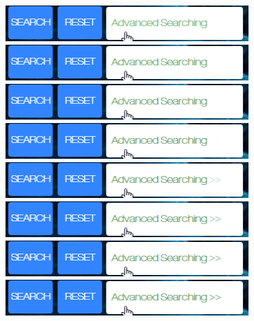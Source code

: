 \documentclass[10pt,twoside,a4paper,titlepage]{article}
\begin{document}
	\newline	
	\includegraphics[width=0.7\textwidth]{cyf/Advanced_searching11.png}
	\newline	
	\includegraphics[width=0.7\textwidth]{cyf/Advanced_searching12.png}
	\newline	
	\includegraphics[width=0.7\textwidth]{cyf/Advanced_searching13.png}
	\newline	
	\includegraphics[width=0.7\textwidth]{cyf/Advanced_searching14.png}
	\newline	
	\includegraphics[width=0.7\textwidth]{cyf/Advanced_searching15.png}
	\newline	
	\includegraphics[width=0.7\textwidth]{cyf/Advanced_searching16.png}
	\newline	
	\includegraphics[width=0.7\textwidth]{cyf/Advanced_searching17.png}
	\newline	
	\includegraphics[width=0.7\textwidth]{cyf/Advanced_searching18.png}
	\newline	
\end{document}
